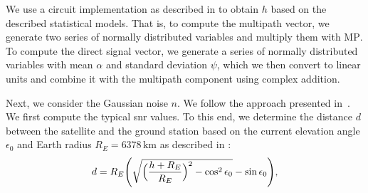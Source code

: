 \documentclass[conference]{IEEEtran}
\newcommand\MP{\ensuremath{\mathrm{MP}}\xspace}
\begin{document}
We use a circuit implementation as described in \cite{DBLP:journals/ijscn/Perez-FontanMMPMMR08} to obtain $h$ based on the described statistical models.
That is, to compute the multipath vector, we generate two series of normally distributed variables and multiply them with \MP.
To compute the direct signal vector, we generate a series of normally distributed variables with mean $\alpha$ and standard deviation $\psi$, which we then convert to linear units and combine it with the multipath component using complex addition.







Next, we consider the Gaussian noise $n$. We follow the approach presented in~\cite{satjscc}. 
We first compute the typical \ac{snr} values. 
To this end, we determine the distance $d$ between the satellite and the ground station based on the current elevation angle $\epsilon_0$ and Earth radius $R_E = 6378\,\textrm{km}$ as described in \cite{}:
%
\begin{equation}
  d = R_E\Biggl(\sqrt{\Bigl(\frac{h + R_E}{R_E}\Bigr)^2 - \cos^{2}\epsilon_{0}} - \sin\epsilon_{0}\Biggr),
\end{equation}
%
\end{document}
